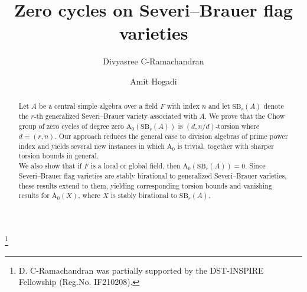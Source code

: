 \documentclass[10pt]{amsart}
\theoremstyle{plain}
\theoremstyle{definition}
\begin{document}
	\title{Zero cycles on Severi--Brauer flag varieties}

    \author[D. C-Ramachandran]{Divyasree C-Ramachandran} \address{Department of Mathematics, IISER Pune, Dr Homi Bhabha Rd, Pashan, Pune, 411008, India}
    \author[A. Hogadi]{Amit Hogadi} \address{Department of Mathematics, IISER Pune, Dr Homi Bhabha Rd, Pashan, Pune, 411008, India}
	
	\thanks{D. C-Ramachandran was partially supported by the DST-INSPIRE Fellowship (Reg.No. IF210208).}
	
	
	\begin{abstract}
		Let \(A\) be a central simple algebra over a field \(F\) with index \(n\) and let \(\mathrm{SB}_r(A)\) denote the \(r\)-th generalized Severi--Brauer variety associated with \(A\). We prove that the Chow group of zero cycles of degree zero \(\mathrm{A_0}(\mathrm{SB}_r(A))\) is \((d, n/d)\)-torsion where \(d = (r,n)\). Our approach reduces the general case to division algebras of prime power index and yields several new instances in which \(\mathrm{A_0}\) is trivial, together with sharper torsion bounds in general.\\ We also show that if \(F\) is a local or global field, then \(\mathrm{A_0}(\mathrm{SB}_r(A))=0\). Since Severi--Brauer flag varieties are stably birational to generalized Severi--Brauer varieties, these results extend to them, yielding corresponding torsion bounds and vanishing results for \(\mathrm{A_0}(X)\), where \(X\) is stably birational to \(\mathrm{SB}_r(A)\).
	\end{abstract}
	
	\maketitle
\end{document}
